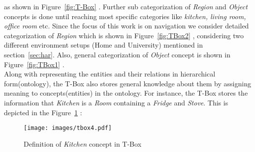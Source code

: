 as shown in Figure~\ref{fig:T-Box} .
Further sub categorization of \textit{Region} and \textit{Object} concepts is done until reaching most specific categories like 
\textit{kitchen, living room, office room} etc.
Since the focus of this work is on navigation we consider detailed categorization of \textit{Region} which is shown in Figure~\ref{fig:TBox2} ,
considering two different environment setups (Home and University) mentioned in section~\ref{sec:har}.
Also, general categorization of \textit{Object} concept is shown in Figure~\ref{fig:TBox1} .\\

Along with representing the entities and their relations in hierarchical form(ontology), the T-Box also stores general knowledge about them by
assigning meaning to concepts(entities) in the ontology.
For instance, the T-Box stores the information that \textit{Kitchen} is a \textit{Room} containing a \textit{Fridge} and \textit{Stove}. 
This is depicted in the Figure~\ref{fig:SM} :

\begin{figure}[htbp] %
   \centering
   \texttt{[image: images/tbox4.pdf]}
   \caption{Definition of \textit{Kitchen} concept in T-Box}
   \label{fig:SM}
\end{figure}

